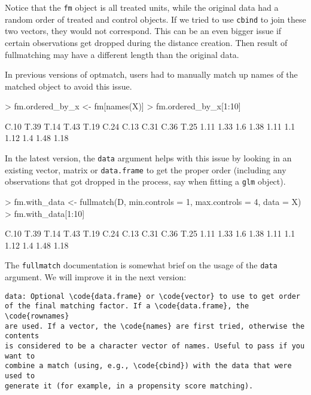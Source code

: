 \documentclass{article}
\begin{document}
Notice that the \texttt{fm} object is all treated units, while the original
data had a random order of treated and control objects. If we tried to use
\texttt{cbind} to join these two vectors, they would not correspond. This can
be an even bigger issue if certain observations get dropped during the
distance creation. Then result of fullmatching may have a different length
than the original data.

In previous versions of optmatch, users had to manually match up names of the
matched object to avoid this issue.

\begin{Schunk}
\begin{Sinput}
> fm.ordered_by_x <- fm[names(X)]
> fm.ordered_by_x[1:10]
\end{Sinput}
\begin{Soutput}
C.10 T.39 T.14 T.43 T.19 C.24 C.13 C.31 C.36 T.25 
1.11 1.33  1.6 1.38 1.11  1.1 1.12  1.4 1.48 1.18 
\end{Soutput}
\end{Schunk}

In the latest version, the \texttt{data} argument helps with this issue by
looking in an existing vector, matrix or \texttt{data.frame} to get the proper
order (including any observations that got dropped in the process, say when
fitting a \texttt{glm} object).

\begin{Schunk}
\begin{Sinput}
> fm.with_data <- fullmatch(D, min.controls = 1, max.controls = 4, data = X)
> fm.with_data[1:10]
\end{Sinput}
\begin{Soutput}
C.10 T.39 T.14 T.43 T.19 C.24 C.13 C.31 C.36 T.25 
1.11 1.33  1.6 1.38 1.11  1.1 1.12  1.4 1.48 1.18 
\end{Soutput}
\end{Schunk}

The \texttt{fullmatch} documentation is somewhat brief on the usage of the
\texttt{data} argument. We will improve it in the next version:

\begin{verbatim}
data: Optional \code{data.frame} or \code{vector} to use to get order
of the final matching factor. If a \code{data.frame}, the \code{rownames}
are used. If a vector, the \code{names} are first tried, otherwise the contents
is considered to be a character vector of names. Useful to pass if you want to
combine a match (using, e.g., \code{cbind}) with the data that were used to
generate it (for example, in a propensity score matching).
\end{verbatim}
\end{document}
